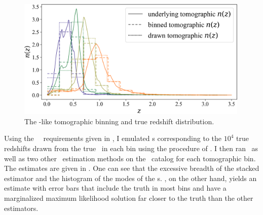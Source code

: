 \begin{figure}
	\begin{center}
		\includegraphics[width=0.99\textwidth]{figures/chippr/cosmolike_inputs.png}
		\caption{The \lsst-like tomographic binning and true redshift distribution.}
	\end{center}
\end{figure}

Using the \lsst\ \pz\ requirements given in , I emulated \pzpdf s corresponding to the $10^{4}$ true redshifts drawn from the true \nz\ in each bin using the procedure of .
I then ran \chippr\ as well as two other \nz\ estimation methods on the \pzpdf\ catalog for each tomographic bin.
The estimates are given in .
One can see that the excessive breadth of the stacked estimator and the histogram of the modes of the \pzpdf s.
\Chippr, on the other hand, yields an estimate with error bars that include the truth in most bins and have a marginalized maximum likelihood solution far closer to the truth than the other estimators.

